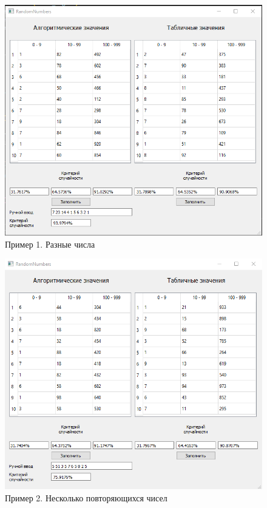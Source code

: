 \documentclass[12pt,a4paper,oneside]{report}
\begin{document}
	\begin{figure}[H]
		\centering
		\includegraphics[scale=0.7]{1.png}
		\caption{Пример 1. Разные числа}
		\label{fig1:image}
	\end{figure}

	\begin{figure}[H]
		\centering
		\includegraphics[scale=0.7]{2.png}
		\caption{Пример 2. Несколько повторяющихся чисел}
		\label{fig2:image}
	\end{figure}
\end{document}
